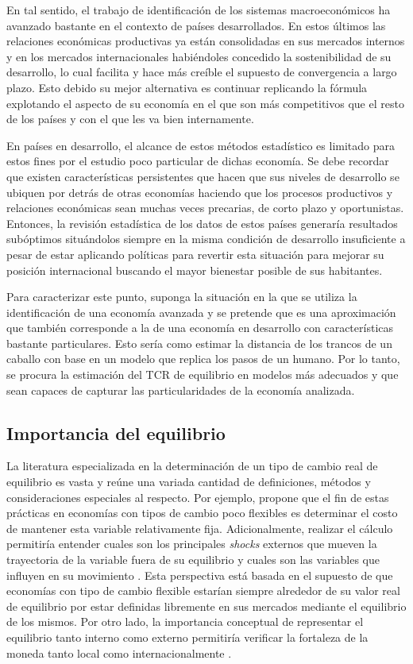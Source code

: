 \documentclass[12pt,letterpaper]{article}
\begin{document}
En tal sentido, el trabajo de identificación de los sistemas macroeconómicos ha avanzado bastante en el contexto de países desarrollados. En estos últimos las relaciones económicas productivas ya están  consolidadas en sus mercados internos y en los mercados internacionales habiéndoles concedido la sostenibilidad de su desarrollo, lo cual facilita y hace más creíble el supuesto de convergencia a largo plazo. Esto debido su mejor alternativa es continuar replicando la fórmula explotando el aspecto de su economía en el que son más competitivos que el resto de los países y con el que les va bien internamente. 

En países en desarrollo, el alcance de estos métodos estadístico es limitado para estos fines por el estudio poco particular de dichas economía. Se debe recordar que existen características persistentes que hacen que sus niveles de desarrollo se ubiquen por detrás de otras economías haciendo que los procesos productivos y relaciones económicas sean muchas veces precarias, de corto plazo y oportunistas. Entonces, la revisión estadística de los datos de estos países generaría resultados subóptimos situándolos siempre en la misma condición de desarrollo insuficiente a pesar de estar aplicando políticas para revertir esta situación para mejorar su posición internacional buscando el mayor bienestar posible de sus habitantes. 

Para caracterizar este punto, suponga la situación en la que se utiliza la identificación de una economía avanzada y se pretende que es una aproximación que también corresponde a la de una economía en desarrollo con características bastante particulares. Esto sería como estimar la distancia de los trancos de un caballo con base en un modelo que replica los pasos de un humano. Por lo tanto, se procura la estimación del TCR de equilibrio en modelos más adecuados y que sean capaces de capturar las particularidades de la economía analizada.


\subsection*{Importancia del equilibrio}
La literatura especializada en la determinación de un tipo de cambio real de equilibrio es vasta y reúne una variada cantidad de definiciones, métodos y consideraciones especiales al respecto. Por ejemplo, \cite{driver2005concepts} propone que el fin de estas prácticas en economías con tipos de cambio poco flexibles es determinar el costo de mantener esta variable relativamente fija. Adicionalmente, realizar el cálculo permitiría entender cuales son los principales \emph{shocks} externos que mueven la trayectoria de la variable fuera de su equilibrio y cuales son las variables que influyen en su movimiento \citep{macdonald2000concepts}. Esta perspectiva está basada en el supuesto de que economías con tipo de cambio flexible estarían siempre alrededor de su valor real de equilibrio por estar definidas libremente en sus mercados mediante el equilibrio de los mismos. Por otro lado, la importancia conceptual de representar el equilibrio tanto interno como externo permitiría verificar la fortaleza de la moneda tanto local como internacionalmente \citep{akrama2003real}.
\end{document}
